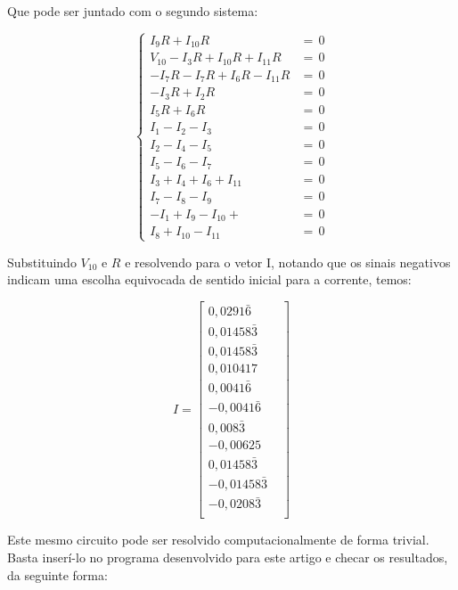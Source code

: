\documentclass[twocolumn, 10pt]{extarticle}
\begin{document}
Que pode ser juntado com o segundo sistema:

\[
\left\{
\begin{aligned}
    I_9R + I_{10}R &= \,0 \\ 
    V_{10} - I_3R + I_{10}R + I_{11}R &= \,0 \\ 
	-I_7R - I_7R + I_6R - I_{11}R &= \,0 \\
	- I_3R + I_2R &= \,0 \\ 
	I_5R + I_6R &= \,0 \\
	I_1 - I_2 - I_3 &= \, 0 \\
    I_2 - I_4 - I_5 &= \, 0 \\
    I_5 - I_6 - I_7 &= \, 0 \\
    I_3 + I_4 + I_6 + I_{11} &= \, 0 \\
    I_7 - I_8 - I_9 &= \, 0 \\
    - I_1 + I_9 - I_{10} + &= \, 0 \\
    I_8 + I_{10} - I_{11} &= \, 0 
\end{aligned}
\right.
\]

Substituindo $V_{10}$ e $R$ e resolvendo para o vetor I, notando que os sinais negativos indicam uma escolha equivocada de sentido inicial para a corrente, temos:

\[
I = 
\begin{bmatrix}
0,0291 \bar 6 & \\
0,01458 \bar 3  & \\
0,01458 \bar 3  & \\
0,010417  & \\
0,0041 \bar 6  & \\
-0,0041 \bar 6  & \\
0,008 \bar 3  & \\
-0,00625  & \\
0,01458\bar 3  & \\
-0,01458\bar 3  & \\
-0,0208\bar 3  & \\
\end{bmatrix}
\]

Este mesmo circuito pode ser resolvido computacionalmente de forma trivial. Basta inserí-lo no programa desenvolvido para este artigo e checar os resultados, da seguinte forma:
\end{document}
